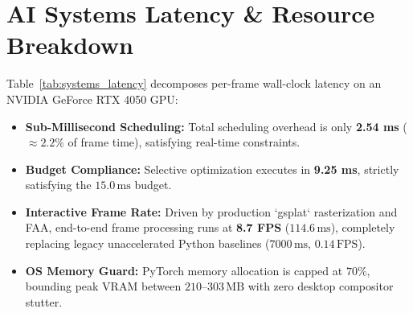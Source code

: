 \documentclass[10pt,twocolumn,letterpaper]{article}
\begin{document}
\section{AI Systems Latency \& Resource Breakdown}
\begin{table}[t]
\centering
\small
{}
\caption{\textbf{AI Systems Latency Breakdown per Frame (NVIDIA RTX 4050).}}
\label{tab:systems_latency}
\end{table}
Table~\ref{tab:systems_latency} decomposes per-frame wall-clock latency on an NVIDIA GeForce RTX 4050 GPU:
\begin{itemize}
\setlength{\itemsep}{1pt}
\item \textbf{Sub-Millisecond Scheduling:} Total scheduling overhead is only \textbf{2.54 ms} ($\approx 2.2\%$ of frame time), satisfying real-time constraints.
\item \textbf{Budget Compliance:} Selective optimization executes in \textbf{9.25 ms}, strictly satisfying the $15.0\,\mathrm{ms}$ budget.
\item \textbf{Interactive Frame Rate:} Driven by production `gsplat` rasterization and FAA, end-to-end frame processing runs at \textbf{8.7 FPS} ($114.6\,\mathrm{ms}$), completely replacing legacy unaccelerated Python baselines ($7000\,\mathrm{ms}$, $0.14\,\mathrm{FPS}$).
\item \textbf{OS Memory Guard:} PyTorch memory allocation is capped at $70\%$, bounding peak VRAM between $210\text{--}303\,\mathrm{MB}$ with zero desktop compositor stutter.
\end{itemize}
\end{document}
